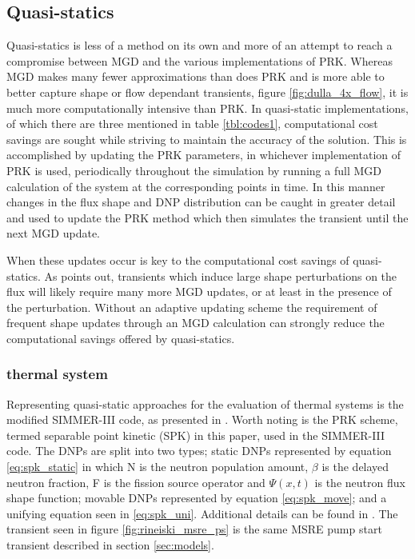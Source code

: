 \documentclass[review]{elsarticle}
\begin{document}
\subsection{Quasi-statics} \label{ssec:qs}
Quasi-statics is less of a method on its own and more of an attempt to
reach a compromise between MGD and the various implementations of PRK. Whereas
MGD makes many fewer approximations than does PRK and is more able to better
capture shape or flow dependant transients, figure \ref{fig:dulla_4x_flow},
it is much more computationally intensive than PRK. In quasi-static
implementations, of which there are three mentioned in table \ref{tbl:codes1},
computational cost savings are sought while striving to maintain the accuracy
of the solution. This is accomplished by updating the PRK parameters, in
whichever implementation of PRK is used, periodically throughout the simulation
by running a full MGD calculation of the system at the corresponding points
in time. In this manner changes in the flux shape and DNP distribution can
be caught in greater detail and used to update the PRK method which then 
simulates the transient until the next MGD update.
\par When these updates occur is key to the computational cost savings of
quasi-statics. As \cite{dulla_models_2005} points out, transients which induce
large shape perturbations on the flux will likely require many more MGD
updates, or at least in the presence of the perturbation. Without an adaptive
updating scheme the requirement of frequent shape updates through an MGD
calculation can strongly reduce the computational savings offered by
quasi-statics.

\subsubsection{thermal system} \label{sssec:qs_therm}
Representing quasi-static approaches for the evaluation of thermal systems
is the modified SIMMER-III code, as presented in \cite{rineiski_kinetics_2005}.
Worth noting is the PRK scheme, termed separable point kinetic (SPK) in this
paper, used in the SIMMER-III code. The DNPs are split into two types;
static DNPs represented by equation \ref{eq:spk_static} in which N is the
neutron
population amount, $\beta$ is the delayed neutron fraction, F is the fission
source operator and $\Psi(x,t)$ is the neutron flux shape function;
 movable DNPs represented by
equation \ref{eq:spk_move}; and a unifying equation seen in \ref{eq:spk_uni}.
Additional details can be found in \cite{rineiski_kinetics_2005}. The transient
seen in figure \ref{fig:rineiski_msre_ps} is the same MSRE pump start transient
described in section \ref{sec:models}.
\end{document}
